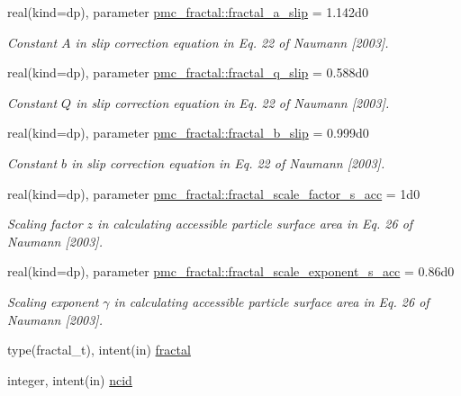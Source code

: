 \begin{DoxyCompactItemize}
\item 
real(kind=dp), parameter \mbox{\hyperlink{namespacepmc__fractal_a0b42b06758d8152d9f0fa472d67a139f}{pmc\+\_\+fractal\+::fractal\+\_\+a\+\_\+slip}} = 1.\+142d0
\begin{DoxyCompactList}\small\item\em Constant $A$ in slip correction equation in Eq. 22 of Naumann \mbox{[}2003\mbox{]}. \end{DoxyCompactList}\item 
real(kind=dp), parameter \mbox{\hyperlink{namespacepmc__fractal_a4eb07a31b109f029c727ec41f6497b42}{pmc\+\_\+fractal\+::fractal\+\_\+q\+\_\+slip}} = 0.\+588d0
\begin{DoxyCompactList}\small\item\em Constant $Q$ in slip correction equation in Eq. 22 of Naumann \mbox{[}2003\mbox{]}. \end{DoxyCompactList}\item 
real(kind=dp), parameter \mbox{\hyperlink{namespacepmc__fractal_a45ff582e36f6e367d3339ee6a0026081}{pmc\+\_\+fractal\+::fractal\+\_\+b\+\_\+slip}} = 0.\+999d0
\begin{DoxyCompactList}\small\item\em Constant $b$ in slip correction equation in Eq. 22 of Naumann \mbox{[}2003\mbox{]}. \end{DoxyCompactList}\item 
real(kind=dp), parameter \mbox{\hyperlink{namespacepmc__fractal_a163c8d35d3501518bf784a7a646c35c4}{pmc\+\_\+fractal\+::fractal\+\_\+scale\+\_\+factor\+\_\+s\+\_\+acc}} = 1d0
\begin{DoxyCompactList}\small\item\em Scaling factor $z$ in calculating accessible particle surface area in Eq. 26 of Naumann \mbox{[}2003\mbox{]}. \end{DoxyCompactList}\item 
real(kind=dp), parameter \mbox{\hyperlink{namespacepmc__fractal_a37704d5061b9ee8a17187d37832a79c0}{pmc\+\_\+fractal\+::fractal\+\_\+scale\+\_\+exponent\+\_\+s\+\_\+acc}} = 0.\+86d0
\begin{DoxyCompactList}\small\item\em Scaling exponent $\gamma$ in calculating accessible particle surface area in Eq. 26 of Naumann \mbox{[}2003\mbox{]}. \end{DoxyCompactList}\item 
type(fractal\+\_\+t), intent(in) \mbox{\hyperlink{fractal_8_f90_a949ba7f6f3ce672ed686152acedb28bf}{fractal}}
\item 
integer, intent(in) \mbox{\hyperlink{fractal_8_f90_a4e89f3f850921ff84a6dfce8b166ad50}{ncid}}
\end{DoxyCompactItemize}


